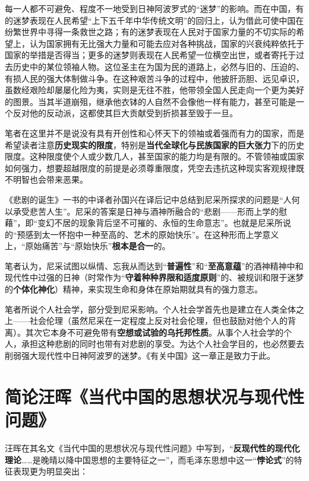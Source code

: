 每一人都不可避免、程度不一地受到日神阿波罗式的``迷梦''的影响。而在中国，有的迷梦表现在人民希望``上下五千年中华传统文明''的回归上，认为借此可使中国在纷繁世界中寻得一条救世之路；有的迷梦表现在人民对于国家力量的不切实际的希望上，认为国家拥有无比强大力量和可能去应对各种挑战，国家的兴衰纯粹依托于国家的举措是否得当；更多的迷梦则表现在人民希望一位横空出世，或者寄托于过去历史中的某位领袖人物。这位圣主在为国为民的道路上，必然与旧的、压迫的、有损人民的强大体制做斗争。在这种艰苦斗争的过程中，他披肝沥胆、远见卓识，虽数经艰险却屡屡化险为夷，实则是无往不胜，他带领全国人民走向一个更为美好的图景。当其半道崩殂，继承他衣钵的人自然不会像他一样有能力，甚至可能是一个反对他的反动派，这都使其巨大贡献受到折损甚至毁于一旦。

笔者在这里并不是说没有具有开创性和心怀天下的领袖或着强而有力的国家，而是希望读者注意\textbf{历史现实的限度}，特别是\textbf{当代全球化与民族国家的巨大张力}下的历史限度。这种限度使个人或少数几人，甚至国家的能力均是有限的。不管领袖或国家如何强力，想要超越限度的前提是必须尊重限度，凭空去违抗这种现实客观规律既不明智也会带来恶果。

《悲剧的诞生》一书的中译者孙国兴在译后记中总结到尼采所探求的问题是``人何以承受悲苦人生''。尼采的答案是日神与酒神所融合的``悲剧------形而上学的慰藉''，即``变幻不居的现象背后坚不可摧的、永恒的生命意志''。也就是尼采所说的``预感到太一怀抱中一种至高的、艺术的原始快乐''。在这种形而上学意义上，``原始痛苦''与``原始快乐''\textbf{根本是合一}的。

笔者认为，尼采试图以纵情、忘我从而达到``\textbf{普遍性}''和``\textbf{至高意蕴}''的酒神精神中和现代性中过强的日神（时常作为``\textbf{守着种种界限和适度原则}''的、被规训和限于迷梦的\textbf{个体化神化}）精神，来实现生命和身体在原始期就具有的强力意志。

笔者所说个人社会学，部分受到尼采影响。个人社会学首先也是建立在人类全体之上------社会伦理（虽然尼采在一定程度上反对社会伦理，但也鼓励对他个人的背离）。其次它本身不可避免带有\textbf{空想或试验的乌托邦性质}。从事个人社会学的个人，承担这种悲剧的同时也带有对悲剧的享受。为达个人社会学目的，也必然要去削弱强大现代性中日神阿波罗的迷梦。《有关中国》这一章正是致力于此。

\section{简论汪晖《当代中国的思想状况与现代性问题》}

汪晖在其名文《当代中国的思想状况与现代性问题》中写到，``\textbf{反现代性的现代化理论}\ldots{}\ldots{}是晚晴以降中国思想的主要特征之一''，而毛泽东思想中这一``\textbf{悖论式}''的特征表现更为明显突出：

